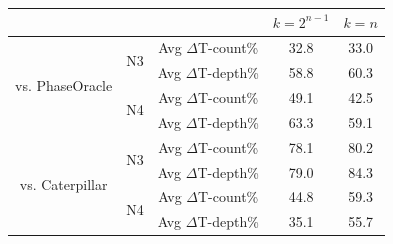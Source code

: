 \begin{tabular}{c|c|c|c|c}\hline
                                   &                       &                       & $k=2^{n-1}$ & $k=n$    \\\hline
  \multirow{4}{*}{vs. PhaseOracle} &  \multirow{2}{*}{N3}  & Avg $\Delta$T-count\% &  32.8      & 33.0    \\\cline{3-5}
                                   &                       & Avg $\Delta$T-depth\% &  58.8      & 60.3    \\\cline{2-5}
                                   &  \multirow{2}{*}{N4}  & Avg $\Delta$T-count\% &  49.1      & 42.5    \\\cline{3-5}
                                   &                       & Avg $\Delta$T-depth\% &  63.3      & 59.1    \\\hline
  \multirow{4}{*}{vs. Caterpillar} &  \multirow{2}{*}{N3}  & Avg $\Delta$T-count\% &  78.1      & 80.2    \\\cline{3-5}
                                   &                       & Avg $\Delta$T-depth\% &  79.0      & 84.3    \\\cline{2-5}
                                   &  \multirow{2}{*}{N4}  & Avg $\Delta$T-count\% &  44.8      & 59.3    \\\cline{3-5}
                                   &                       & Avg $\Delta$T-depth\% &  35.1      & 55.7    \\\hline
\end{tabular}

